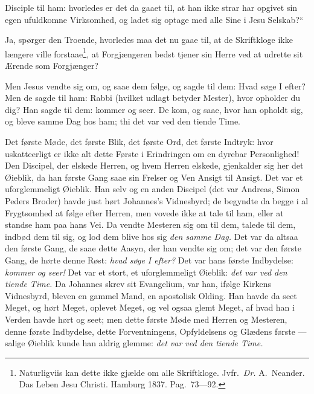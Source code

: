 \documentclass[12pt,a4paper]{book}
\begin{document}
Disciple til ham: hvorledes er det da gaaet til, at han ikke strar har
opgivet sin egen ufuldkomne Virksomhed, og ladet sig optage med alle Sine i Jesu Selskab?“

Ja, spørger den Troende, hvorledes maa det nu gaae til, at de Skriftkloge ikke længere
ville forstaae\footnote{%
  Naturligviis kan dette ikke gjælde om alle Skriftkloge. Jvfr.\ \textit{Dr.} A.\
  Neander. Das Leben Jesu Christi. Hamburg 1837. Pag.\ 73---92.%
}, at Forgjængeren bedst tjener sin Herre ved at udrette sit Ærende som Forgjænger?

\begingroup\large
Men Jesus vendte sig om, og saae dem følge, og sagde til dem: Hvad søge I efter? Men de
sagde til ham: Rabbi (hvilket udlagt betyder Mester), hvor opholder du dig? Han sagde til
dem: kommer og seer. De kom, og saae, hvor han opholdt sig, og bleve samme Dag hos ham;
thi det var ved den tiende Time.
\par\endgroup

Det første Møde, det første Blik, det første Ord, det første Indtryk: hvor uskatteerligt
er ikke alt dette Første i Erindringen om en dyrebar Personlighed! Den Discipel, der
elskede Herren, og hvem Herren elskede, gjenkalder sig her det Øieblik, da han første
Gang saae sin Frelser og Ven Ansigt til Ansigt. Det var et uforglemmeligt Øieblik. Han
selv og en anden Discipel (det var Andreas, Simon Peders Broder) havde just hørt
Johannes's Vidnesbyrd; de begyndte da begge i al Frygtsomhed at følge efter Herren, men
vovede ikke at tale til ham, eller at standse ham paa hans Vei. Da vendte Mesteren sig om
til dem, talede til dem, indbød dem til sig, og lod dem blive hos sig \emph{den samme
Dag.} Det var da altsaa den første Gang, de saae dette Aasyn, der han vendte sig om; det
var den første Gang, de hørte denne Røst: \emph{hvad søge I efter?} Det var hans første
Indbydelse: \emph{kommer og seer!} Det var et stort, et uforglemmeligt Øieblik:
\emph{det var ved den
tiende Time.} Da Johannes skrev sit Evangelium, var han, ifølge Kirkens Vidnesbyrd,
bleven en gammel Mand, en apostolisk Olding. Han havde da seet Meget, og hørt Meget,
oplevet Meget, og vel ogsaa glemt Meget, af hvad han i Verden havde hørt og seet; men
dette første Møde med Herren og Mesteren, denne første Indbydelse, dette Forventningens,
Opfyldelsens og Glædens første --- salige Øieblik kunde han aldrig glemme: \emph{det var
ved den tiende Time.}
\end{document}
